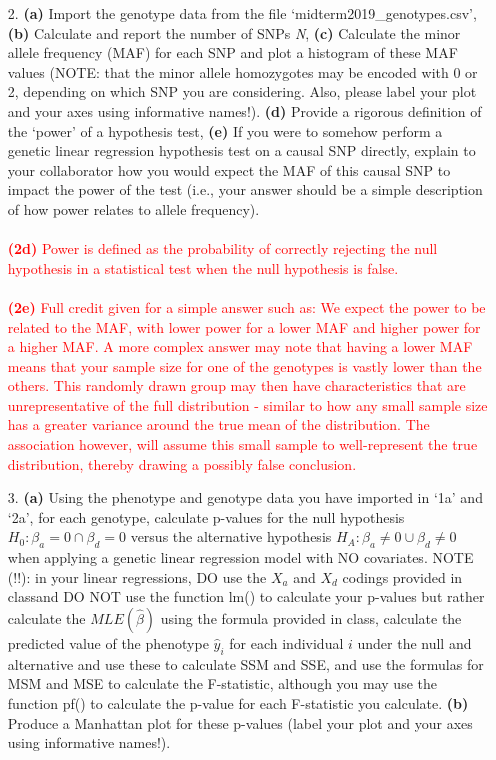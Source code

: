 \documentclass[letterpaper, 11pt]{article}
\begin{document}
\begin{itemize}
\item[2.] \textbf{(a)} Import the genotype data from the file `midterm2019\_genotypes.csv', \textbf{(b)} Calculate and report the number of SNPs \textit{N}, \textbf{(c)} Calculate the minor allele frequency (MAF) for each SNP and plot a histogram of these MAF values (NOTE: that the minor allele homozygotes may be encoded with 0 or 2, depending on which SNP you are considering.  Also, please label your plot and your axes using informative names!). \textbf{(d)} Provide a rigorous definition of the `power' of a hypothesis test, \textbf{(e)} If you were to somehow perform a genetic linear regression hypothesis test on a causal SNP directly, explain to your collaborator how you would expect the MAF of this causal SNP to impact the power of the test (i.e., your answer should be a simple description of how power relates to allele frequency). 
\\
\\
 \textcolor{red}{ 
\textbf{(2d)} Power is defined as the probability of correctly rejecting the null hypothesis in a statistical test when the null hypothesis is false.
\\
\\
\textbf{(2e)} Full credit given for a simple answer such as: We expect the power to be related to the MAF, with lower power for a lower MAF and higher power for a higher MAF.  A more complex answer may note that having a lower MAF means that your sample size for one of the genotypes is vastly lower than the others.  This randomly drawn group may then have characteristics that are unrepresentative of the full distribution - similar to how any small sample size has a greater variance around the true mean of the distribution.  The association however, will assume this small sample to well-represent the true distribution, thereby drawing a possibly false conclusion.
}

\item[3.]  \textbf{(a)} Using the phenotype and genotype data you have imported in `1a' and `2a', for each genotype, calculate p-values for the null hypothesis $H_0: \beta_a = 0 \cap \beta_d=0$ versus the alternative hypothesis $H_A: \beta_a \neq 0 \cup \beta_d \neq 0$ when applying a genetic linear regression model with NO covariates.  NOTE (!!): in your linear regressions, DO use the $X_a$ and $X_d$ codings provided in classand DO NOT use the function lm() to calculate your p-values but rather calculate the $MLE(\hat{\beta})$ using the formula provided in class, calculate the predicted value of the phenotype $\hat{y}_i$ for each individual $i$ under the null and alternative and use these to calculate SSM and SSE, and use the formulas for MSM and MSE to calculate the F-statistic, although you may use the function pf() to calculate the p-value for each F-statistic you calculate. \textbf{(b)} Produce a Manhattan plot for these p-values (label your plot and your axes using informative names!).  


\end{itemize}
\end{document}
